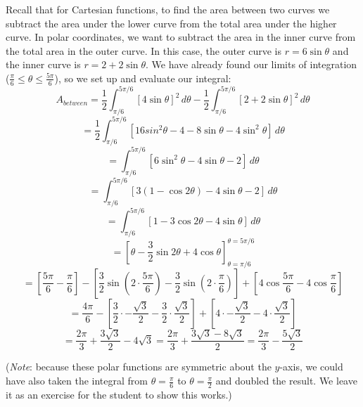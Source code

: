 Recall that for Cartesian functions, to find the area between two curves we 
subtract the area under the lower curve from the total area under the higher 
curve. In polar coordinates, we want to subtract the area in the inner curve 
from the total area in the outer curve. In this case, the outer curve is $r = 
6\sin{\theta}$ and the inner curve is $r = 2 + 2\sin{\theta}$. We have already 
found our limits of integration ($\frac{\pi}{6} \leq \theta \leq \frac{5 \pi}{
6}$), so we set up and evaluate our integral:
$$A_{between} = \frac{1}{2} \int_{\pi / 6}^{5 \pi / 6} \left[ 4 \sin{\theta} 
\right]^2\,d\theta - \frac{1}{2} \int_{\pi / 6}^{5 \pi / 6} \left[ 2 + 2 \sin{
\theta} \right]^2\,d\theta$$
$$= \frac{1}{2} \int_{\pi / 6}^{5 \pi / 6} \left[ 16 sin^2{\theta} - 4 - 8 
\sin{\theta} - 4 \sin^2{\theta} \right] \, d\theta$$
$$= \int_{\pi / 6}^{5 \pi / 6} \left[ 6 \sin^2{\theta} - 4\sin{\theta} - 2 
\right]\, d\theta$$
$$= \int_{\pi / 6}^{5 \pi / 6} \left[ 3 \left( 1 - \cos{2\theta} \right) - 4
\sin{\theta} - 2 \right] \, d\theta$$
$$= \int_{\pi / 6}^{5 \pi / 6} \left[ 1 - 3\cos{2\theta} - 4\sin{\theta} 
\right] \, d\theta$$
$$= \left[ \theta - \frac{3}{2}\sin{2\theta} + 4\cos{\theta} \right]_{\theta = 
\pi / 6}^{\theta = 5 \pi / 6}$$
$$= \left[ \frac{5\pi}{6} - \frac{\pi}{6} \right] - \left[ \frac{3}{2} \sin{
\left( 2 \cdot \frac{5\pi}{6} \right)} - \frac{3}{2} \sin{\left( 2 \cdot \frac{
\pi}{6} \right)} \right] + \left[ 4\cos{\frac{5\pi}{6}} - 4\cos{\frac{\pi}{6}} 
\right]$$
$$= \frac{4\pi}{6} - \left[ \frac{3}{2} \cdot -\frac{\sqrt{3}}{2} - \frac{3}{2}
\cdot \frac{\sqrt{3}}{2} \right] + \left[ 4 \cdot -\frac{\sqrt{3}}{2} - 4 \cdot
\frac{\sqrt{3}}{2} \right]$$
$$= \frac{2\pi}{3} + \frac{3\sqrt{3}}{2} - 4\sqrt{3} = \frac{2\pi}{3} + \frac{3
\sqrt{3} - 8\sqrt{3}}{2} = \frac{2\pi}{3} - \frac{5\sqrt{3}}{2}$$

(\textit{Note}: because these polar functions are symmetric about the $y$-axis,
we could have also taken the integral from $\theta = \frac{\pi}{6}$ to $\theta 
= \frac{\pi}{2}$ and doubled the result. We leave it as an exercise for the 
student to show this works.)

